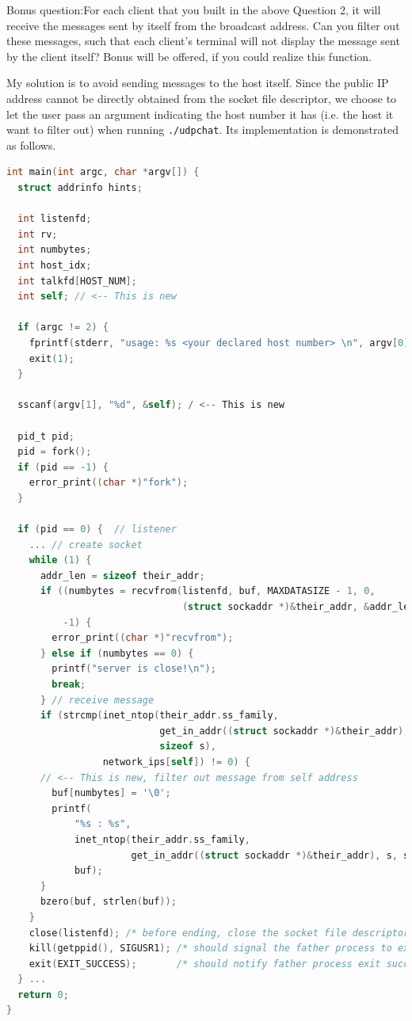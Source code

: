 \begin{exercise}[]{Bonus question:For each client that you built in the above Question 2, it will receive the messages sent by itself from the broadcast address. Can you filter out these messages, such that each client’s terminal will not display the message sent by the client itself? Bonus will be offered, if you could realize this function. }
  
My solution is to avoid sending messages to the host itself. Since the public IP address cannot be directly obtained from the socket file descriptor, we choose to let the user pass an argument indicating the host number it has (i.e. the host it want to filter out) when running \texttt{./udpchat}. Its implementation is demonstrated as follows.


\begin{lstlisting}[language=C]
int main(int argc, char *argv[]) {
  struct addrinfo hints;

  int listenfd;
  int rv;
  int numbytes;
  int host_idx;
  int talkfd[HOST_NUM];
  int self; // <-- This is new

  if (argc != 2) {
    fprintf(stderr, "usage: %s <your declared host number> \n", argv[0]);
    exit(1);
  }

  sscanf(argv[1], "%d", &self); / <-- This is new

  pid_t pid;
  pid = fork();
  if (pid == -1) {
    error_print((char *)"fork");
  }

  if (pid == 0) {  // listener
    ... // create socket
    while (1) {
      addr_len = sizeof their_addr;
      if ((numbytes = recvfrom(listenfd, buf, MAXDATASIZE - 1, 0,
                               (struct sockaddr *)&their_addr, &addr_len)) ==
          -1) {
        error_print((char *)"recvfrom");
      } else if (numbytes == 0) {
        printf("server is close!\n");
        break;
      } // receive message
      if (strcmp(inet_ntop(their_addr.ss_family,
                           get_in_addr((struct sockaddr *)&their_addr), s,
                           sizeof s),
                 network_ips[self]) != 0) {
      // <-- This is new, filter out message from self address
        buf[numbytes] = '\0';
        printf(
            "%s : %s",
            inet_ntop(their_addr.ss_family,
                      get_in_addr((struct sockaddr *)&their_addr), s, sizeof s),
            buf);
      }
      bzero(buf, strlen(buf));
    }
    close(listenfd); /* before ending, close the socket file descriptor */
    kill(getppid(), SIGUSR1); /* should signal the father process to exit */
    exit(EXIT_SUCCESS);       /* should notify father process exit success */
  } ...
  return 0;
}
\end{lstlisting}




\end{exercise}
